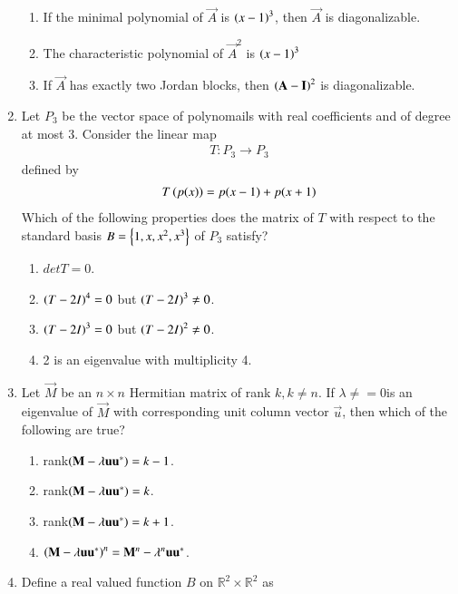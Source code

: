 \begin{enumerate}[label=\thesection.\arabic*.,ref=\thesection.\theenumi]
\begin{enumerate}
\item If the minimal polynomial of  $\vec{A}$ is $\left(x-1\right)^3$, then  $\vec{A}$ is diagonalizable.
\item  The characteristic polynomial of  $\vec{A}^2$ is $\left(x-1\right)^3$
\item If $\vec{A}$ has exactly two Jordan blocks, then $\left(\mathbf{A}-\mathbf{I}\right)^2$ is diagonalizable. 
\end{enumerate}
\solution

%
\item Let $P_3$ be the vector space of polynomails with real coefficients and of degree at most 3.  Consider the linear map
\begin{align}
T:P_3\to P_3
\end{align}
defined by 
\begin{align}
T\left(p(x)\right) = p(x-1)+p(x+1)
\end{align}
%
Which of the following properties does the matrix of $T$ with respect to the standard basis
$B = \left\{1,x,x^2,x^3\right\}$ of $P_3$ satisfy?
\begin{enumerate}
\item $det T = 0$.
\item $\left(T-2I\right)^4 = 0$ but $\left(T-2I\right)^3 \ne 0$.
\item $\left(T-2I\right)^3 = 0$ but $\left(T-2I\right)^2 \ne 0$.
\item 2 is an eigenvalue with multiplicity 4.
\end{enumerate}
%
\solution

\item Let $\vec{M}$ be an $n \times n$ Hermitian matrix of rank $k, k \ne n$.  If $\lambda \ne = 0$is an eigenvalue of $\vec{M}$ with corresponding unit column vector $\vec{u}$, then which of the
following are true?
\begin{enumerate}
\item rank$\left(\mathbf{M}- \lambda \mathbf{u}\mathbf{u}^*\right) = k-1$.
\item rank$\left(\mathbf{M}- \lambda \mathbf{u}\mathbf{u}^*\right) = k$.
\item rank$\left(\mathbf{M}- \lambda \mathbf{u}\mathbf{u}^*\right) = k+1$.
\item $\left(\mathbf{M}- \lambda \mathbf{u}\mathbf{u}^*\right)^n = \mathbf{M}^n - \lambda^n \mathbf{u}\mathbf{u}^*$.
\end{enumerate}
%
\solution

\item Define a real valued function $B$ on $\mathbb{R}^2 \times \mathbb{R}^2 $ as 
\begin{align}

\end{align}
\end{enumerate}
